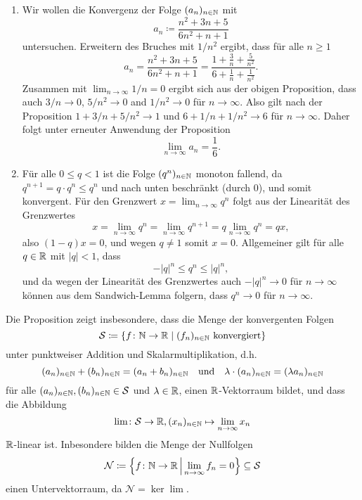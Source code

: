 \documentclass[a4paper,10pt]{article}
\begin{document}
\begin{bsp}
 \begin{enumerate}
  \item
   Wir wollen die Konvergenz der Folge $(a_n)_{n \in \mathbb{N}}$ mit
   \[
    a_n \coloneqq \frac{n^2 + 3n + 5}{6n^2 + n + 1}
   \]
   untersuchen. Erweitern des Bruches mit $1/n^2$ ergibt, dass für alle $n \geq 1$
   \[
    a_n
    = \frac{n^2 + 3n + 5}{6n^2 + n + 1}
    = \frac{1 + \frac{3}{n} + \frac{5}{n^2}}{6 + \frac{1}{n} + \frac{1}{n^2}}.
   \]
   Zusammen mit $\lim_{n \to \infty} 1/n = 0$ ergibt sich aus der obigen Proposition, dass auch $3/n \to 0$, $5/n^2 \to 0$ and $1/n^2 \to 0$ für $n \to \infty$. Also gilt nach der Proposition $1 + 3/n + 5/n^2 \to 1$ und $6 + 1/n + 1/n^2 \to 6$ für $n \to \infty$. Daher folgt unter erneuter Anwendung der Proposition
   \[
    \lim_{n \to \infty} a_n = \frac{1}{6}.
   \]
  \item
   Für alle $0 \leq q < 1$ ist die Folge $(q^n)_{n \in \mathbb{N}}$ monoton fallend, da $q^{n+1} = q \cdot q^n \leq q^n$ und nach unten beschränkt (durch $0$), und somit konvergent. Für den Grenzwert $x = \lim_{n \to \infty} q^n$ folgt aus der Linearität des Grenzwertes
   \[
    x = \lim_{n \to \infty} q^n = \lim_{n \to \infty} q^{n+1} = q \lim_{n \to \infty} q^n = q x,
   \]
   also $(1-q)x = 0$, und wegen $q \neq 1$ somit $x = 0$. Allgemeiner gilt für alle $q \in \mathbb{R}$ mit $|q| < 1$, dass
   \[
    -|q|^n \leq q^n \leq |q|^n,
   \]
   und da wegen der Linearität des Grenzwertes auch $-|q|^n \to 0$ für $n \to \infty$ können aus dem Sandwich-Lemma folgern, dass $q^n \to 0$ für $n \to \infty$.
 \end{enumerate}
\end{bsp}


\begin{bem}
 Die Proposition zeigt insbesondere, dass die Menge der konvergenten Folgen
 \[
  \mathcal{S} \coloneqq \{f \colon \mathbb{N} \to \mathbb{R} \mid \text{$(f_n)_{n \in \mathbb{N}}$ konvergiert}\}
 \]
 unter punktweiser Addition und Skalarmultiplikation, d.h.
 \[
  (a_n)_{n \in \mathbb{N}} + (b_n)_{n \in \mathbb{N}} = (a_n + b_n)_{n \in \mathbb{N}}
  \quad
  \text{und}
  \quad
  \lambda \cdot (a_n)_{n \in \mathbb{N}} = (\lambda a_n)_{n \in \mathbb{N}}
 \]
 für alle $(a_n)_{n \in \mathbb{N}}, (b_n)_{n \in \mathbb{N}} \in \mathcal{S}$ und $\lambda \in \mathbb{R}$, einen $\mathbb{R}$-Vektorraum bildet, und dass die Abbildung
 \[
  \lim \colon \mathcal{S} \to \mathbb{R}, (x_n)_{n \in \mathbb{N}} \mapsto \lim_{n \to \infty} x_n
 \]
 $\mathbb{R}$-linear ist. Inbesondere bilden die Menge der Nullfolgen
 \[
  \mathcal{N}
  \coloneqq \left\{ f \colon \mathbb{N} \to \mathbb{R} \,\middle|\, \lim_{n \to \infty} f_n = 0 \right\}
  \subseteq \mathcal{S}
 \]
 einen Untervektorraum, da $\mathcal{N} = \ker \lim$.
\end{bem}
\end{document}
